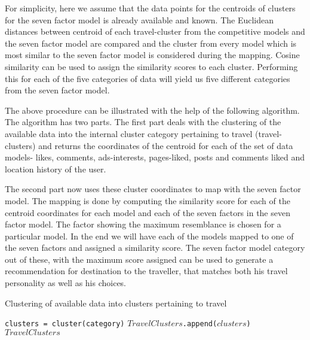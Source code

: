 For simplicity, here we assume that the data points for the centroids of clusters for the seven factor model \cite{sertkan2018mapping} is already available and known. The Euclidean distances between centroid of each travel-cluster from  the competitive models and the seven factor model are compared and the cluster from every model which is most similar to the seven factor model is considered during the mapping. Cosine similarity can be used to assign the similarity scores to each cluster. Performing this for each of the five categories of data will yield us five different categories from the seven factor model.

The above procedure can be illustrated with the help of the following algorithm. The algorithm has two parts. The first part deals with the clustering of the available data into the internal cluster category pertaining to travel (travel-clusters) and returns the coordinates of the centroid for each of the set of data models- likes, comments, ads-interests, pages-liked, posts and comments liked and location history of the user.

The second part now uses these cluster coordinates to map with the seven factor model. The mapping is done by computing the similarity score for each of the centroid coordinates for each model and each of the seven factors in the seven factor model. The factor showing the maximum resemblance is chosen for a particular model. In the end we will have each of the models mapped to one of the seven factors and assigned a similarity score. The seven factor model category out of these, with the maximum score assigned can be used to generate a recommendation for destination to the traveller, that matches both his travel personality as well as his choices.

\begin{algorithm}\label{algo:ProclivityProp2}
\caption{Clustering of available data into clusters pertaining to travel}
\begin{algorithmic}
  \Input
  \EndInput
  \Output
  \EndOutput
  \newline
        \State \texttt{clusters = cluster(category)}
        \newline
        \State \texttt{$TravelClusters$.append($clusters$)}
      \EndFor
      \newline
       \Return \texttt{$TravelClusters$}
    \EndProcedure
 \end{algorithmic}
\end{algorithm}

